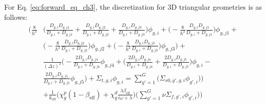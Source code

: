 For Eq. \ref{eq:forward_eq_ch3}, the discretization for 3D triangular geometries is as follows:
\begin{equation}
        \begin{aligned}
                \biggl( \frac{8}{h^2} &\biggl( \frac{D_{g,i}D_{g,j1}}{D_{g,i}+D_{g,j1}} + \frac{D_{g,i}D_{g,j2}}{D_{g,i}+D_{g,j2}} + \frac{D_{g,i}D_{g,j3}}{D_{g,i}+D_{g,j3}} \biggr) \phi_{g,i} + \biggl(-\frac{8}{h^2}\frac{D_{g,i}D_{g,j1}}{D_{g,i}+D_{g,j1}}\biggr) \phi_{g,j1} + \\ 
               &\biggl(-\frac{8}{h^2}\frac{D_{g,i}D_{g,j2}}{D_{g,i}+D_{g,j2}}\biggr) \phi_{g,j2} + \biggl(-\frac{8}{h^2}\frac{D_{g,i}D_{g,j3}}{D_{g,i}+D_{g,j3}}\biggr) \phi_{g,j3} \biggr) + \\ 
                &\frac{1}{(\Delta z)^2} \biggl( -\frac{2D_{g,i}D_{g,j4}}{D_{g,i}+D_{g,j4}} \phi_{g,j4} + \biggl(\frac{2D_{g,i}D_{g,j4}}{D_{g,i}+D_{g,j4}}+\frac{2D_{g,i}D_{g,j5}}{D_{g,i}+D_{g,j5}}\biggr) \phi_{g,i} - \\
                &\frac{2D_{g,i}D_{g,j5}}{D_{g,i}+D_{g,j5}} \phi_{g,j5} \biggr) + \Sigma_{t,g,i} \phi_{g,i} =  \sum_{g' = 1}^{G} \biggl(\Sigma_{s0,g',g,i} \phi_{g',i}) \biggr)\\
                & + \frac{1}{k_{\text{eff}}} \biggl( \chi^p_g (1-\beta_{\text{eff}}) + \chi^d_g \frac{\lambda \beta_{\text{eff}}}{i \omega + \lambda} \biggr)  \biggl( \sum_{g' = 1}^{G} \nu \Sigma_{f,g',i} \phi_{g',i}) \biggr)
        \end{aligned}
        \label{eq:forward_3D_tri_disc}
\end{equation}

